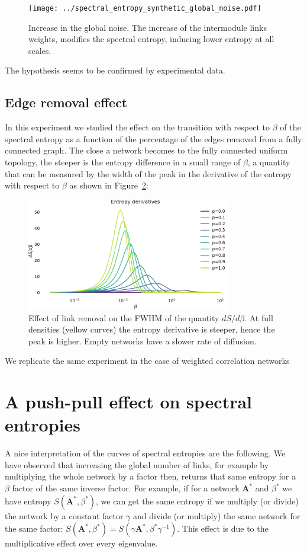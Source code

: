 \documentclass[a4paper]{article}
\newcommand{\bA}{\mathbf{A}}
\begin{document}
\begin{figure}
\texttt{[image: ../spectral\_entropy\_synthetic\_global\_noise.pdf]}
\caption{Increase in the global noise. The increase of the intermodule links weights, modifies the spectral entropy, inducing lower entropy at all scales.}
\label{fig:benchmark_network}
\end{figure}
The hypothesis seems to be confirmed by experimental data.

\newpage
\subsection{Edge removal effect}
In this experiment we studied the effect on the transition with respect to $\beta$ of the spectral entropy as a function of the percentage of the edges removed from a fully connected graph.
The close a network becomes to the fully connected uniform topology, the steeper is the entropy difference in a small range of $\beta$, a quantity that can be measured by the width of the peak in the derivative of the entropy with respect to $\beta$ as shown in Figure~\ref{fig:beta_deriv_clique_removal}:
\begin{figure}[htb]
\centering
\includegraphics[width=0.8\textwidth]{entropy_derivative_er.pdf}
\caption{Effect of link removal on the FWHM of the quantity $dS/d\beta$. At full densities (yellow curves) the entropy derivative is steeper, hence the peak is higher. Empty networks have a slower rate of diffusion. }
\label{fig:beta_deriv_clique_removal}
\end{figure}

We replicate the same experiment in the case of weighted correlation networks

\newpage
\section{A push-pull effect on spectral entropies}
A nice interpretation of the curves of spectral entropies are the following.
We have observed that increasing the global number of links, for example by multiplying the whole network by a factor then, returns that same entropy for a $\beta$ factor of the same inverse factor.
For example, if for a network $\bA^*$ and $\beta^*$ we have entropy $S(\bA^*, \beta^*)$, we can get the same entropy if we multiply (or divide) the network by a constant factor $\gamma$ and divide (or multiply) the same network for the same factor: $S(\bA^*, \beta^*) = S(\gamma \bA^*, \beta^* \gamma^{-1})$. This effect is due to the multiplicative effect over every eigenvalue.
\end{document}
